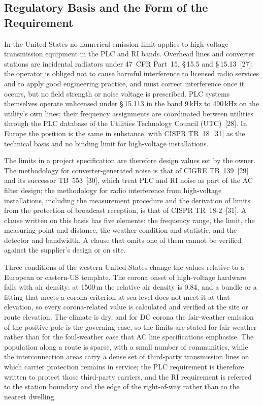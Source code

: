\subsection{Regulatory Basis and the Form of the Requirement}
\label{sec:interference-basis}

In the United States no numerical emission limit applies to high-voltage
transmission equipment in the PLC and RI bands. Overhead lines and converter
stations are incidental radiators under 47~CFR Part~15, \S\,15.5 and
\S\,15.13~[27]: the operator is obliged not to cause harmful interference to
licensed radio services and to apply good engineering practice, and must
correct interference once it occurs, but no field strength or noise voltage
is prescribed. PLC systems themselves operate unlicensed under \S\,15.113 in
the band 9\,kHz to 490\,kHz on the utility's own lines; their frequency
assignments are coordinated between utilities through the PLC database of
the Utilities Technology Council (UTC)~[28]. In Europe the position is the
same in substance, with CISPR TR~18~[31] as the technical basis and no binding
limit for high-voltage installations.

The limits in a project specification are therefore design values set by the
owner. The methodology for converter-generated noise is that of CIGRE
TB~139~[29] and its successor TB~553~[30], which treat PLC and RI noise as
part of the AC filter design; the methodology for radio interference from
high-voltage installations, including the measurement procedure and the
derivation of limits from the protection of broadcast reception, is that of
CISPR TR~18-2~[31]. A clause written on this basis has five elements: the
frequency range, the limit, the measuring point and distance, the weather
condition and statistic, and the detector and bandwidth. A clause that omits
one of them cannot be verified against the supplier's design or on site.

Three conditions of the western United States change the values relative to
a European or eastern-US template. The corona onset of high-voltage hardware
falls with air density: at 1500\,m the relative air density is 0.84, and a
bundle or a fitting that meets a corona criterion at sea level does not meet
it at that elevation, so every corona-related value is calculated and
verified at the site or route elevation. The climate is dry, and for DC
corona the fair-weather emission of the positive pole is the governing case,
so the limits are stated for fair weather rather than for the foul-weather
case that AC line specifications emphasise. The population along a route is
sparse, with a small number of communities, while the interconnection areas
carry a dense set of third-party transmission lines on which carrier
protection remains in service; the PLC requirement is therefore written to
protect those third-party carriers, and the RI requirement is referred to the
station boundary and the edge of the right-of-way rather than to the nearest
dwelling.
\FloatBarrier
